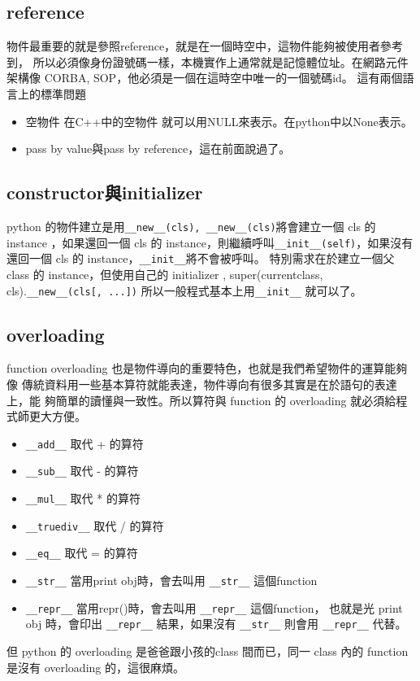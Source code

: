   \subsection{reference}
  物件最重要的就是參照reference，就是在一個時空中，這物件能夠被使用者參考到，
  所以必須像身份證號碼一樣，本機實作上通常就是記憶體位址。在網路元件架構像
  CORBA, SOP，他必須是一個在這時空中唯一的一個號碼id。
  這有兩個語言上的標準問題
  \begin{itemize}
    \item 空物件 在C++中的空物件 就可以用NULL來表示。在python中以None表示。
    \item pass by value與pass by reference，這在前面說過了。
  \end{itemize}

  \subsection{constructor與initializer}
  python 的物件建立是用\verb=__new__(cls), __new__(cls)=將會建立一個 cls 的 instance
  ，如果還回一個 cls 的 instance，則繼續呼叫\verb=__init__(self)=，如果沒有還回一個
  cls 的 instance，\verb=__init__=將不會被呼叫。 特別需求在於建立一個父 class 的
  instance，但使用自己的 initializer , super(currentclass, cls).\verb=__new__(cls[, ...])=
  所以一般程式基本上用\verb=__init__= 就可以了。

  \subsection{overloading}
  function overloading 也是物件導向的重要特色，也就是我們希望物件的運算能夠像
  傳統資料用一些基本算符就能表達，物件導向有很多其實是在於語句的表達上，能
  夠簡單的讀懂與一致性。所以算符與 function 的 overloading 就必須給程式師更大方便。
  \begin{itemize}
    \item \verb=__add__= 取代 + 的算符
    \item \verb=__sub__= 取代 - 的算符
    \item \verb=__mul__= 取代 * 的算符
    \item \verb=__truediv__= 取代 / 的算符
    \item \verb=__eq__= 取代 = 的算符
    \item \verb=__str__= 當用print obj時，會去叫用 \verb=__str__= 這個function
    \item \verb=__repr__= 當用repr()時，會去叫用 \verb=__repr__= 這個function，
                        也就是光 print obj 時，會印出 \verb=__repr__= 結果，如果沒有
                        \verb=__str__= 則會用 \verb=__repr__= 代替。
  \end{itemize}
  但 python 的 overloading 是爸爸跟小孩的class 間而已，同一 class 內的 function
  是沒有 overloading 的，這很麻煩。

